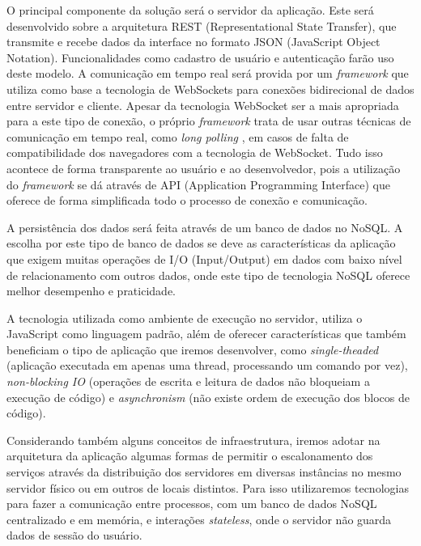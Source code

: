 O principal componente da solução será o servidor da aplicação. Este será desenvolvido sobre a arquitetura REST (Representational State Transfer), que transmite e recebe dados da interface no formato JSON (JavaScript Object Notation). Funcionalidades como cadastro de usuário e autenticação farão uso deste modelo. A comunicação em tempo real será provida por um \textit{framework} que utiliza como base a tecnologia de WebSockets para conexões bidirecional de dados entre servidor e cliente. Apesar da tecnologia WebSocket ser a mais apropriada para a este tipo de conexão, o próprio \textit{framework} trata de usar outras técnicas de comunicação em tempo real, como \textit{long polling} \cite{long-polling}, em casos de falta de compatibilidade dos navegadores com a tecnologia de WebSocket. Tudo isso acontece de forma transparente ao usuário e ao desenvolvedor, pois a utilização do \textit{framework} se dá através de API (Application Programming Interface) que oferece de forma simplificada todo o processo de conexão e comunicação.

A persistência dos dados será feita através de um banco de dados no NoSQL. A escolha por este tipo de banco de dados se deve as características da aplicação que exigem muitas operações de I/O (Input/Output) em dados com baixo nível de relacionamento com outros dados, onde este tipo de tecnologia NoSQL oferece melhor desempenho e praticidade.

A tecnologia utilizada como ambiente de execução no servidor, utiliza o JavaScript como linguagem padrão, além de oferecer características que também beneficiam o tipo de aplicação que iremos desenvolver, como \textit{single-theaded} (aplicação executada em apenas uma thread, processando um comando por vez), \textit{non-blocking IO} \cite{non-blocking-io} (operações de escrita e leitura de dados não bloqueiam a execução de código) e \textit{asynchronism} \cite{asynchronism} (não existe ordem de execução dos blocos de código). 

Considerando também alguns conceitos de infraestrutura, iremos adotar na arquitetura da aplicação algumas formas de permitir o escalonamento dos serviços através da distribuição dos servidores em diversas instâncias no mesmo servidor físico ou em outros de locais distintos. Para isso utilizaremos tecnologias para fazer a comunicação entre processos, com um banco de dados NoSQL centralizado e em memória, e interações \textit{stateless}, onde o servidor não guarda dados de sessão do usuário.